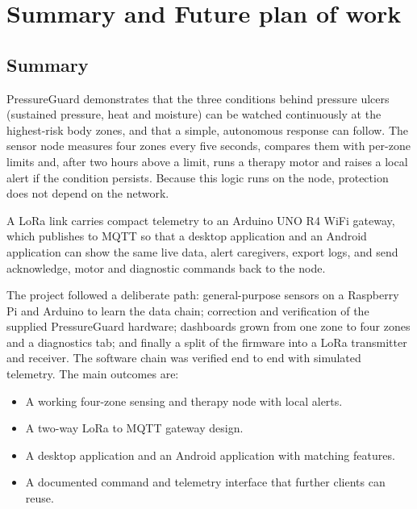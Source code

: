 \clearpage
\section{Summary and Future plan of work}
\label{sec:summary}

\subsection{Summary}
PressureGuard demonstrates that the three conditions behind pressure ulcers (sustained pressure, heat and moisture) can be watched continuously at the highest-risk body zones, and that a simple, autonomous response can follow. The sensor node measures four zones every five seconds, compares them with per-zone limits and, after two hours above a limit, runs a therapy motor and raises a local alert if the condition persists. Because this logic runs on the node, protection does not depend on the network.

A LoRa link carries compact telemetry to an Arduino UNO R4 WiFi gateway, which publishes to MQTT so that a desktop application and an Android application can show the same live data, alert caregivers, export logs, and send acknowledge, motor and diagnostic commands back to the node.

The project followed a deliberate path: general-purpose sensors on a Raspberry Pi and Arduino to learn the data chain; correction and verification of the supplied PressureGuard hardware; dashboards grown from one zone to four zones and a diagnostics tab; and finally a split of the firmware into a LoRa transmitter and receiver. The software chain was verified end to end with simulated telemetry. The main outcomes are:
\begin{itemize}
\item A working four-zone sensing and therapy node with local alerts.
\item A two-way LoRa to MQTT gateway design.
\item A desktop application and an Android application with matching features.
\item A documented command and telemetry interface that further clients can reuse.
\end{itemize}

